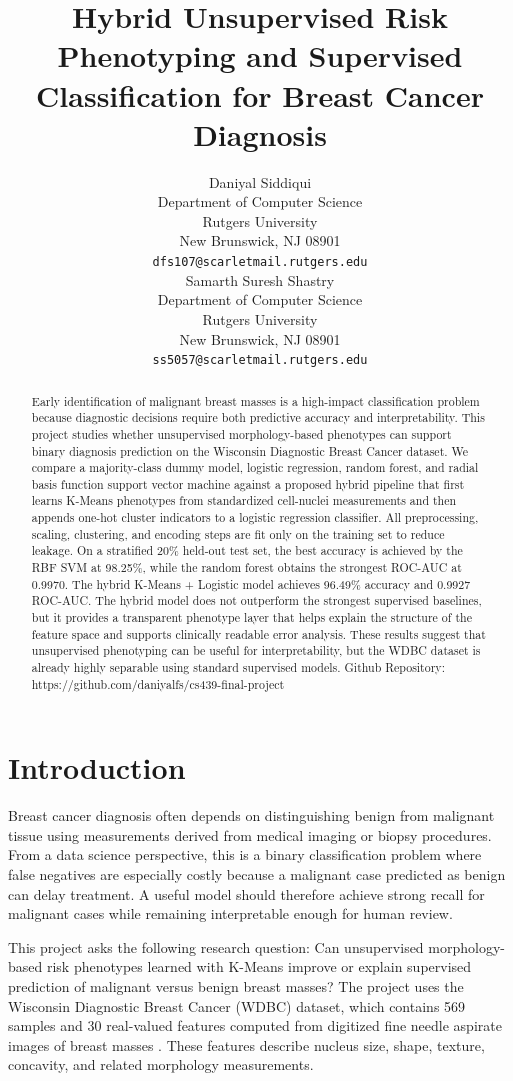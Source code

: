 \documentclass{article}
\title{Hybrid Unsupervised Risk Phenotyping and Supervised Classification for Breast Cancer Diagnosis}
\author{%
  Daniyal Siddiqui \\
  Department of Computer Science \\
  Rutgers University \\
  New Brunswick, NJ 08901 \\
  \texttt{dfs107@scarletmail.rutgers.edu} \\
  \And
  Samarth Suresh Shastry \\
  Department of Computer Science \\
  Rutgers University \\
  New Brunswick, NJ 08901 \\
  \texttt{ss5057@scarletmail.rutgers.edu} \\
}
\begin{document}
\maketitle

\begin{abstract}
Early identification of malignant breast masses is a high-impact classification problem because diagnostic decisions require
both predictive accuracy and interpretability. This project studies whether unsupervised morphology-based phenotypes can
support binary diagnosis prediction on the Wisconsin Diagnostic Breast Cancer dataset. We compare a majority-class dummy
model, logistic regression, random forest, and radial basis function support vector machine against a proposed hybrid pipeline
that first learns K-Means phenotypes from standardized cell-nuclei measurements and then appends one-hot cluster indicators
to a logistic regression classifier. All preprocessing, scaling, clustering, and encoding steps are fit only on the training set to
reduce leakage. On a stratified 20\% held-out test set, the best accuracy is achieved by the RBF SVM at 98.25\%, while the
random forest obtains the strongest ROC-AUC at 0.9970. The hybrid K-Means + Logistic model achieves 96.49\% accuracy
and 0.9927 ROC-AUC. The hybrid model does not outperform the strongest supervised baselines, but it provides a transparent
phenotype layer that helps explain the structure of the feature space and supports clinically readable error analysis. These
results suggest that unsupervised phenotyping can be useful for interpretability, but the WDBC dataset is already highly
separable using standard supervised models. Github Repository: https://github.com/daniyalfs/cs439-final-project
\end{abstract}

\section{Introduction}

Breast cancer diagnosis often depends on distinguishing benign from malignant tissue using measurements derived from
medical imaging or biopsy procedures. From a data science perspective, this is a binary classification problem where false
negatives are especially costly because a malignant case predicted as benign can delay treatment. A useful model should
therefore achieve strong recall for malignant cases while remaining interpretable enough for human review.

This project asks the following research question: Can unsupervised morphology-based risk phenotypes learned with
K-Means improve or explain supervised prediction of malignant versus benign breast masses? The project uses the Wisconsin
Diagnostic Breast Cancer (WDBC) dataset, which contains 569 samples and 30 real-valued features computed from digitized
fine needle aspirate images of breast masses \cite{uci_wdbc}. These features describe nucleus size, shape, texture, concavity, and related
morphology measurements.
\end{document}
